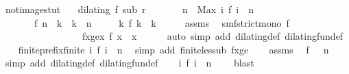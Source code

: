 \begin{isabellebody}
%
\endisadelimproof
\isanewline
{}\isamarkupfalse%
\ not{\isacharunderscore}image{\isacharunderscore}stut{\isacharcolon}\isanewline
\ \ \ {\isacartoucheopen}dilating\ f\ sub\ r{\isacartoucheclose}\isanewline
\ \ \ \ \ \ \ {\isacartoucheopen}n\ {\isacharequal}\ Max\ {\isacharbraceleft}i{\isachardot}\ f\ i\ {\isasymle}\ n{\isacharbraceright}{\isacartoucheclose}\isanewline
\ \ \ \ \ \ \ {\isacartoucheopen}f\ n\ {\isacharless}\ k\ {\isasymand}\ k\ {\isasymle}\ n{\isacartoucheclose}\isanewline
\ \ \ \ \ {\isacartoucheopen}{\isasymnexists}k\ f\ k\ {\isacharequal}\ k{\isacartoucheclose}\isanewline
%
\isadelimproof
%
\endisadelimproof
%
\isatagproof
{}\isamarkupfalse%
\ {\isacharminus}\isanewline
\ \ \isamarkupfalse%
\ assms{\isacharparenleft}{}{\isacharparenright}\ \isamarkupfalse%
\ smf{\isacharcolon}{\isacartoucheopen}strict{\isacharunderscore}mono\ f{\isacartoucheclose}\isanewline
\ \ \ \ \ \ \ \ \ \ \ \ \ \ \ \ \ fxge{\isacharcolon}{\isacartoucheopen}{\isasymforall}x{\isachardot}\ f\ x\ {\isasymge}\ x{\isacartoucheclose}\isanewline
\ \ \ \ \isamarkupfalse%
\ {\isacharparenleft}auto\ simp\ add{\isacharcolon}\ dilating{\isacharunderscore}def\ dilating{\isacharunderscore}fun{\isacharunderscore}def{\isacharparenright}\isanewline
\ \ \isamarkupfalse%
\ finite{\isacharunderscore}prefix{\isacharcolon}{\isacartoucheopen}finite\ {\isacharbraceleft}i{\isachardot}\ f\ i\ {\isasymle}\ n{\isacharbraceright}{\isacartoucheclose}\ \isamarkupfalse%
\ {\isacharparenleft}simp\ add{\isacharcolon}\ finite{\isacharunderscore}less{\isacharunderscore}ub\ fxge{\isacharparenright}\isanewline
\ \ \isamarkupfalse%
\ assms{\isacharparenleft}{}{\isacharparenright}\ \isamarkupfalse%
\ {\isacartoucheopen}f\ {}\ {\isasymle}\ n{\isacartoucheclose}\ \isamarkupfalse%
\ {\isacharparenleft}simp\ add{\isacharcolon}\ dilating{\isacharunderscore}def\ dilating{\isacharunderscore}fun{\isacharunderscore}def{\isacharparenright}\isanewline
\ \ \isamarkupfalse%
\ {\isacartoucheopen}{\isacharbraceleft}i{\isachardot}\ f\ i\ {\isasymle}\ n{\isacharbraceright}\ {\isasymnoteq}\ {\isacharbraceleft}{\isacharbraceright}{\isacartoucheclose}\ \isamarkupfalse%
\ blast\isanewline
\ \ \isamarkupfalse%

\end{isabellebody}
